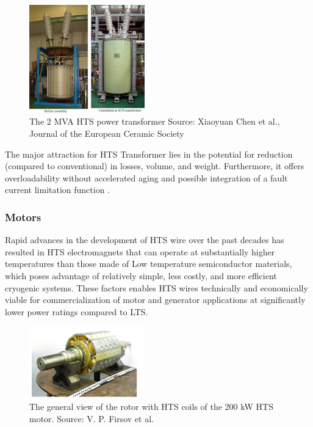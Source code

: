 \documentclass{article}
\begin{document}
	\begin{figure}[h]
		\centering
		\includegraphics[width=5cm]{hts_transformer.jpeg}
		\caption{The 2 MVA HTS power transformer Source:  Xiaoyuan Chen et al., Journal of the European Ceramic Society  }
	\end{figure} 
	
	The major attraction for HTS Transformer lies in the potential for reduction (compared to conventional) in losses, volume, and weight. Furthermore, it offers overloadability without accelerated aging and possible integration of a fault current limitation function \cite{htspa}.
	\subsubsection{Motors}
	Rapid advances in the development of HTS
	wire over the past decades has resulted in HTS electromagnets that can operate at substantially higher temperatures than those made of Low temperature semiconductor materials, which poses advantage of relatively simple, less costly, and more efficient cryogenic systems.
	These factors enables HTS wires technically and economically viable for commercialization of motor and generator applications at significantly lower power ratings compared to LTS.
	
	\begin{figure}[h]
		\centering
		\includegraphics[width=5cm]{The-general-view-of-the-rotor-with-HTS-coils-of-the-200-kW-HTS-motor.png}
		\caption{The general view of the rotor with HTS coils of the 200 kW HTS motor. Source: V. P. Firsov et al. \cite{htsstator}}
		
	\end{figure} 
	
\end{document}
